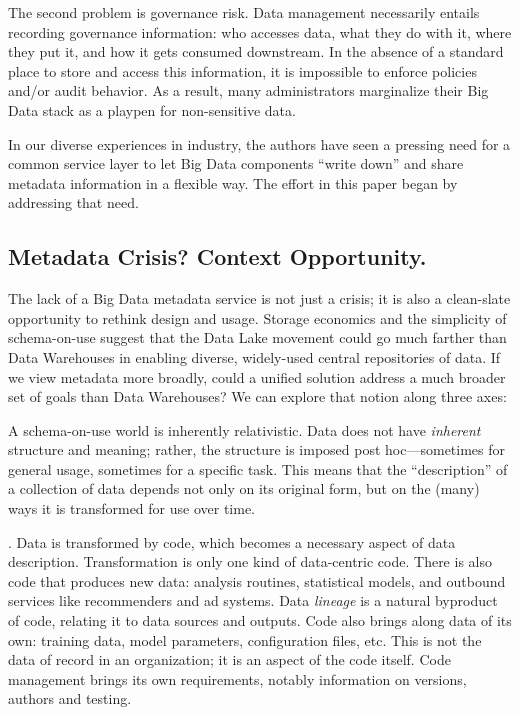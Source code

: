 \documentclass{sig-alternate}
\begin{document}
The second problem is governance risk. Data management necessarily entails recording governance information: who accesses data, what they do with it, where they put it, and how it gets consumed downstream. 
In the absence of a standard place to store and access this information, it is impossible to enforce policies and/or audit behavior. As a result, many administrators marginalize their Big Data stack as a playpen for non-sensitive data.

In our diverse experiences in industry, the authors have seen a pressing need for a common service layer to let Big Data components ``write down'' and share metadata information in a flexible way. The effort in this paper began by addressing that need.

\subsection{Metadata Crisis? Context Opportunity.}
The lack of a Big Data metadata service is not just a crisis; it is also a clean-slate opportunity to rethink design and usage. Storage economics and the simplicity of schema-on-use suggest that the Data Lake movement could go much farther than Data Warehouses in enabling diverse, widely-used central repositories of data.  If we view metadata more broadly, could a unified solution address a much broader set of goals than Data Warehouses? We can explore that notion along three axes:

 A schema-on-use world is inherently relativistic. Data does not have \emph{inherent} structure and meaning; rather, the structure is imposed post hoc---sometimes for general usage, sometimes for a specific task.  This means that the ``description'' of a collection of data depends not only on its original form, but on the (many) ways it is transformed for use over time.  

. Data is transformed by code, which becomes a necessary aspect of data description. Transformation is only one kind of data-centric code. There is also code that produces new data: analysis routines, statistical models, and outbound services like recommenders and ad systems. Data \emph{lineage} is a natural byproduct of code, relating it to data sources and outputs. Code also brings along data of its own: training data, model parameters, configuration files, etc. This is not the data of record in an organization; it is an aspect of the code itself. Code management brings its own requirements, notably information on versions, authors and testing.  
\end{document}
